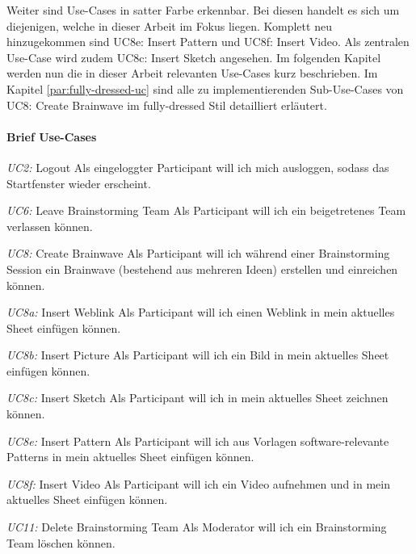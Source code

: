 Weiter sind Use-Cases in satter Farbe erkennbar. Bei diesen handelt es sich um diejenigen, welche in dieser Arbeit im Fokus liegen. Komplett neu hinzugekommen sind UC8e: Insert Pattern und UC8f: Insert Video. Als zentralen Use-Case wird zudem UC8c: Insert Sketch angesehen. Im folgenden Kapitel werden nun die in dieser Arbeit relevanten Use-Cases kurz beschrieben. Im Kapitel \ref{par:fully-dressed-uc} sind alle zu implementierenden Sub-Use-Cases von UC8: Create Brainwave im fully-dressed Stil detailliert erläutert.
\paragraph{Brief Use-Cases}

\begin{basedescript}{
		\desclabelstyle{\multilinelabel}
		\desclabelwidth{4.5cm}
		\setlength{\itemsep}{5ex}}
	
	\item[\textit{UC2: }Logout] Als eingeloggter Participant will ich mich ausloggen, sodass das Startfenster wieder erscheint.
	
	\item[\textit{UC6: }Leave Brainstorming Team] Als Participant will ich ein beigetretenes Team verlassen können.
		
	\item[\textit{UC8: }Create Brainwave] Als Participant will ich während einer Brainstorming Session ein Brainwave (bestehend aus mehreren Ideen) erstellen und einreichen können. 
	
	\item[\textit{UC8a: }Insert Weblink] Als Participant will ich einen Weblink in mein aktuelles Sheet einfügen können.
	
	\item[\textit{UC8b: }Insert Picture] Als Participant will ich ein Bild in mein aktuelles Sheet einfügen können.
	
	\item[\textit{UC8c: }Insert Sketch] Als Participant will ich in mein aktuelles Sheet zeichnen können.
	
	\item[\textit{UC8e: }Insert Pattern] Als Participant will ich aus Vorlagen software-relevante Patterns in mein aktuelles Sheet einfügen können.
	
	\item[\textit{UC8f: }Insert Video] Als Participant will ich ein Video aufnehmen und in mein aktuelles Sheet einfügen können.
	
	\item[\textit{UC11: }Delete Brainstorming Team] Als Moderator will ich ein Brainstorming Team löschen können.
\end{basedescript}
\vspace{1cm}

